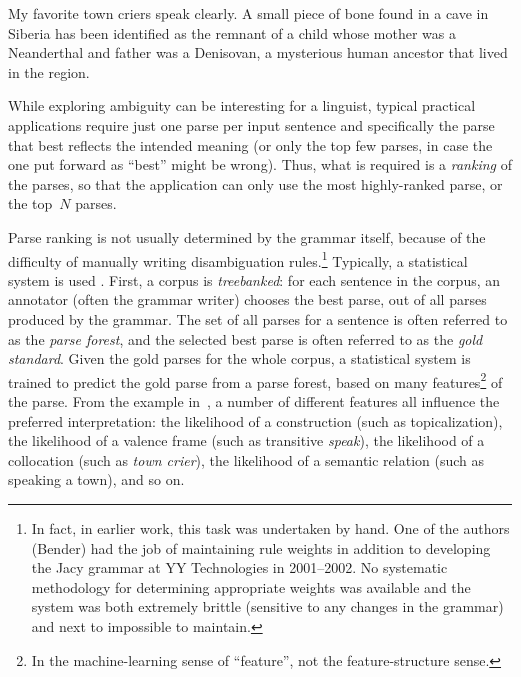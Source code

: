 \documentclass[output=paper,nonflat]{langsci/langscibook}
\begin{document}
\begin{exe}
\ex\label{cl:ex:ambig-simple}
My favorite town criers speak clearly.
\ex\label{cl:ex:ambig-many}
A small piece of bone found in a cave in Siberia has been identified
as the remnant of a child whose mother was a Neanderthal and father was a Denisovan,
a mysterious human ancestor that lived in the region.
\end{exe}

While exploring ambiguity can be interesting for a linguist,
typical practical applications require just one parse per input sentence
and specifically the parse that best reflects the intended meaning
(or only the top few parses, in case the one put forward as ``best'' might be wrong).
Thus, what is required is a \textit{ranking} of the parses,
so that the application can only use the most highly-ranked parse,
or the top~$N$ parses.

Parse ranking is not usually determined by the grammar itself, because
of the difficulty of manually writing disambiguation
rules.\footnote{In fact, in earlier work, this task was undertaken by
  hand. One of the authors (Bender) had the job of maintaining rule
  weights in addition to developing the Jacy grammar \citep*{SBB2016a}
  at YY Technologies in 2001--2002. No systematic methodology for
  determining appropriate weights was available and the system was
  both extremely brittle (sensitive to any changes in the grammar) and
  next to impossible to maintain.}
Typically, a statistical system is used \citep{Tou:Man:Shi:Fli:Oep:02,Tou:Man:Fli:Oep:05}.
First, a corpus is \textit{treebanked}:
for each sentence in the corpus,
an annotator (often the grammar writer) chooses the best parse,
out of all parses produced by the grammar.
The set of all parses for a sentence is often referred to as the \textit{parse forest},
and the selected best parse is often referred to as the \textit{gold standard}.
Given the gold parses for the whole corpus, a statistical system is trained
to predict the gold parse from a parse forest,
based on many features\footnote{%
	In the machine-learning sense of ``feature'',
	not the feature-structure sense.
}
of the parse.
From the example in~,
a number of different features all influence the preferred interpretation:
the likelihood of a construction (such as topicalization),
the likelihood of a valence frame (such as transitive \textit{speak}),
the likelihood of a collocation (such as \textit{town crier}),
the likelihood of a semantic relation (such as speaking a town),
and so on.
\end{document}
